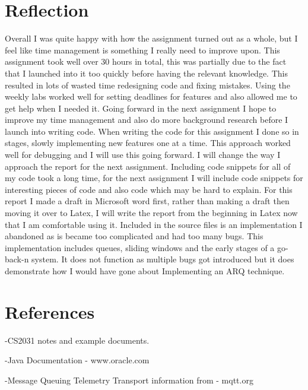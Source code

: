 \documentclass{article}
\begin{document}
\section{Reflection}
\label{sec:Reflection}

Overall I was quite happy with how the assignment turned out as a whole, but I feel like time management is something I really need to improve upon. This assignment took well over 30 hours in total, this was partially due to the fact that I launched into it too quickly before having the relevant knowledge. This resulted in lots of wasted time redesigning code and fixing mistakes. Using the weekly labs worked well for setting deadlines for features and also allowed me to get help when I needed it. Going forward in the next assignment I hope to improve my time management and also do more background research before I launch into writing code. When writing the code for this assignment I done so in stages, slowly implementing new features one at a time. This approach worked well for debugging and I will use this going forward. I will change the way I approach the report for the next assignment. Including code snippets for all of my code took a long time, for the next assignment I will include code snippets for interesting pieces of code and also code which may be hard to explain. For this report I made a draft in Microsoft word first, rather than making a draft then moving it over to Latex, I will write the report from the beginning in Latex now that I am comfortable using it.
\newline
\newline
Included in the source files is an implementation I abandoned as is became too complicated and had too many bugs. This implementation includes queues, sliding windows and the early stages of a go-back-n system. It does not function as multiple bugs got introduced but it does demonstrate how I would have gone about Implementing an ARQ technique.

\section{References}

-CS2031 notes and example documents.

-Java Documentation - www.oracle.com

-Message Queuing Telemetry Transport information from - mqtt.org
\end{document}
